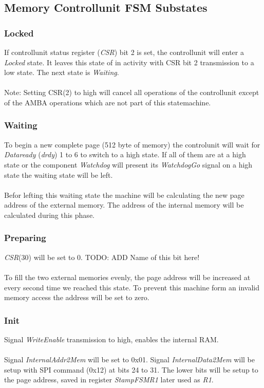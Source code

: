 \subsection{Memory Controllunit FSM Substates}
\subsubsection{Locked} 
If controllunit status register (\textit{CSR}) bit 2 is set, the controllunit will enter a \textit{Locked} state. It leaves this state of in activity with CSR bit 2 transmission to a low state. The next state is \textit{Waiting}. \\\\
Note: Setting CSR(2) to high will cancel all operations of the controllunit except of the AMBA operations which are not part of this statemachine. 
\subsubsection{Waiting} 
To begin a new complete page (512 byte of memory) the controlunit will wait for \textit{Dataready} (\textit{drdy}) 1 to 6 to switch to a high state. If all of them are at a high state or the component \textit{Watchdog} will present its \textit{WatchdogGo} signal on a high state the waiting state will be left. \\\\
Befor lefting this waiting state the machine will be calculating the new page address of the external memory. The address of the internal memory will be calculated during this phase. 
\subsubsection{Preparing} 
\textit{CSR}(30) will be set to 0. TODO: ADD Name of this bit here! \\\\
To fill the two external memories evenly, the page address will be increased at every second time we reached this state. To prevent this machine form an invalid memory access the address will be set to zero. 
\subsubsection{Init}
Signal \textit{WriteEnable} transmission to high, enables the internal RAM.\\\\
Signal \textit{InternalAddr2Mem} will be set to 0x01. 
Signal \textit{InternalData2Mem} will be setup with SPI command (0x12) at bits 24 to 31. The lower bits will be setup to the page address, saved in register \textit{StampFSMR1} later used as \textit{R1}. 
